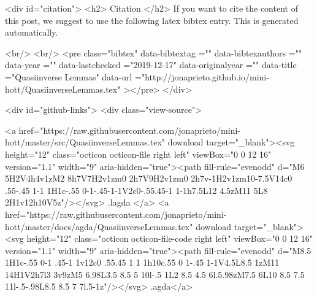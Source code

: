   
  <div id="citation">
  <h2> Citation </h2>
  If you want to cite the content of this post,
  we suggest to use the following latex bibtex entry.
  This is generated automatically.

  <br/>
  <br/>
  <pre class="bibtex"
       data-bibtextag =""
       data-bibtexauthors =""
       data-year =""
       data-lastchecked ="2019-12-17"
       data-originalyear =""
       data-title ="Quasiinverse Lemmas"
       data-url ="http://jonaprieto.github.io/mini-hott/QuasiinverseLemmas.tex"
  ></pre>
  </div>
  

  <div id="github-links">
    <div class="view-source">
      
        <a href="https://raw.githubusercontent.com/jonaprieto/mini-hott/master/src/QuasiinverseLemmas.tex" download target="_blank"><svg height="12" class="octicon octicon-file right left" viewBox="0 0 12 16" version="1.1" width="9" aria-hidden="true"><path fill-rule="evenodd" d="M6 5H2V4h4v1zM2 8h7V7H2v1zm0 2h7V9H2v1zm0 2h7v-1H2v1zm10-7.5V14c0 .55-.45 1-1 1H1c-.55 0-1-.45-1-1V2c0-.55.45-1 1-1h7.5L12 4.5zM11 5L8 2H1v12h10V5z"/></svg> .lagda </a>
        <a href="https://raw.githubusercontent.com/jonaprieto/mini-hott/master/docs/agda/QuasiinverseLemmas.tex" download target="_blank"><svg height="12" class="octicon octicon-file-code right left" viewBox="0 0 12 16" version="1.1" width="9" aria-hidden="true"><path fill-rule="evenodd" d="M8.5 1H1c-.55 0-1 .45-1 1v12c0 .55.45 1 1 1h10c.55 0 1-.45 1-1V4.5L8.5 1zM11 14H1V2h7l3 3v9zM5 6.98L3.5 8.5 5 10l-.5 1L2 8.5 4.5 6l.5.98zM7.5 6L10 8.5 7.5 11l-.5-.98L8.5 8.5 7 7l.5-1z"/></svg> .agda</a>
      

